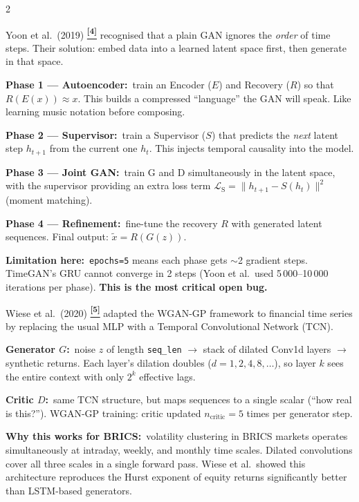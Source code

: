 \documentclass[10pt]{article}
\newcommand{\navybox}[2]{\begin{tcolorbox}[mybox={Navy}{LBg},title={#1}]#2\end{tcolorbox}}
\newcommand{\skybox}[2]{\begin{tcolorbox}[mybox={Sky}{BBg},title={#1}]#2\end{tcolorbox}}
\newcommand{\tcite}[1]{%
  \hyperlink{R:#1}{\textsuperscript{\scriptsize\textbf{[#1]}}}}
\begin{document}
\vspace{6pt}
\begin{multicols}{2}

\navybox{TimeGAN: Four Phases to Learn Temporal Structure}{%
Yoon et al.\ (2019)\tcite{4} recognised that a plain GAN ignores the \emph{order} of time steps. Their solution: embed data into a learned latent space first, then generate in that space.

\smallskip
\textbf{Phase 1 --- Autoencoder:}\ train an Encoder ($E$) and Recovery ($R$) so that $R(E(x)) \approx x$. This builds a compressed ``language'' the GAN will speak. Like learning music notation before composing.

\textbf{Phase 2 --- Supervisor:}\ train a Supervisor ($S$) that predicts the \emph{next} latent step $h_{t+1}$ from the current one $h_t$. This injects temporal causality into the model.

\textbf{Phase 3 --- Joint GAN:}\ train G and D simultaneously in the latent space, with the supervisor providing an extra loss term $\mathcal{L}_\text{S} = \|h_{t+1} - S(h_t)\|^2$ (moment matching).

\textbf{Phase 4 --- Refinement:}\ fine-tune the recovery $R$ with generated latent sequences. Final output: $\tilde{x} = R(G(z))$.

\textbf{Limitation here:}\ \texttt{epochs=5} means each phase gets $\sim$2 gradient steps. TimeGAN's GRU cannot converge in 2 steps (Yoon et al.\ used 5\,000--10\,000 iterations per phase). \textcolor{DRed}{\textbf{This is the most critical open bug.}}}

\skybox{QuantGAN: Dilated Patterns Across Time Scales}{%
Wiese et al.\ (2020)\tcite{5} adapted the WGAN-GP framework to financial time series by replacing the usual MLP with a Temporal Convolutional Network (TCN).

\smallskip
\textbf{Generator $G$:}\ noise $z$ of length \texttt{seq\_len} $\to$ stack of dilated Conv1d layers $\to$ synthetic returns. Each layer's dilation doubles ($d = 1, 2, 4, 8, \ldots$), so layer $k$ sees the entire context with only $2^k$ effective lags.

\textbf{Critic $D$:}\ same TCN structure, but maps sequences to a single scalar (``how real is this?''). WGAN-GP training: critic updated $n_\text{critic}=5$ times per generator step.

\textbf{Why this works for BRICS:}\ volatility clustering in BRICS markets operates simultaneously at intraday, weekly, and monthly time scales. Dilated convolutions cover all three scales in a single forward pass. Wiese et al.\ showed this architecture reproduces the Hurst exponent of equity returns significantly better than LSTM-based generators.}


\end{multicols}
\end{document}
